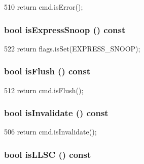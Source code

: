 \begin{DoxyCode}
510 { return cmd.isError(); }
\end{DoxyCode}
\hypertarget{classPacket_aa20026c596161a1efabde68c4a34e00b}{
\subsubsection[{isExpressSnoop}]{\setlength{\rightskip}{0pt plus 5cm}bool isExpressSnoop () const}}
\label{classPacket_aa20026c596161a1efabde68c4a34e00b}



\begin{DoxyCode}
522 { return flags.isSet(EXPRESS_SNOOP); }
\end{DoxyCode}
\hypertarget{classPacket_a5e6baaa42eabbb07af2d1769e3c0499b}{
\subsubsection[{isFlush}]{\setlength{\rightskip}{0pt plus 5cm}bool isFlush () const}}
\label{classPacket_a5e6baaa42eabbb07af2d1769e3c0499b}



\begin{DoxyCode}
512 { return cmd.isFlush(); }
\end{DoxyCode}
\hypertarget{classPacket_a4a1a39b8ffab2d6266cd9d794ca332e3}{
\subsubsection[{isInvalidate}]{\setlength{\rightskip}{0pt plus 5cm}bool isInvalidate () const}}
\label{classPacket_a4a1a39b8ffab2d6266cd9d794ca332e3}



\begin{DoxyCode}
506 { return cmd.isInvalidate(); }
\end{DoxyCode}
\hypertarget{classPacket_a8965874e960faf91ad4b6af8dbf31875}{
\subsubsection[{isLLSC}]{\setlength{\rightskip}{0pt plus 5cm}bool isLLSC () const}}
\label{classPacket_a8965874e960faf91ad4b6af8dbf31875}



